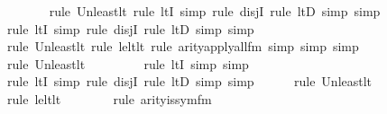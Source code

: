 \begin{isabellebody}
\ \ \ \ \ \ \isamarkupfalse%
{\isacharparenleft}{\kern0pt}rule\ Un{\isacharunderscore}{\kern0pt}least{\isacharunderscore}{\kern0pt}lt{\isacharcomma}{\kern0pt}\ rule\ ltI{\isacharcomma}{\kern0pt}\ simp{\isacharcomma}{\kern0pt}\ rule\ disjI{}{\isacharcomma}{\kern0pt}\ rule\ ltD{\isacharcomma}{\kern0pt}\ simp{\isacharcomma}{\kern0pt}\ simp{\isacharparenright}{\kern0pt}\isanewline
\ \ \ \ \ \ \isamarkupfalse%
{\isacharparenleft}{\kern0pt}rule\ ltI{\isacharcomma}{\kern0pt}\ simp\ {\isacharcomma}{\kern0pt}rule\ disjI{}{\isacharcomma}{\kern0pt}\ rule\ ltD{\isacharcomma}{\kern0pt}\ simp{\isacharcomma}{\kern0pt}\ simp{\isacharparenright}{\kern0pt}\isanewline
\ \ \ \ \ \isamarkupfalse%
{\isacharparenleft}{\kern0pt}rule\ Un{\isacharunderscore}{\kern0pt}least{\isacharunderscore}{\kern0pt}lt{\isacharcomma}{\kern0pt}\ rule\ le{\isacharunderscore}{\kern0pt}lt{\isacharunderscore}{\kern0pt}lt{\isacharcomma}{\kern0pt}\ rule\ arity{\isacharunderscore}{\kern0pt}apply{\isacharunderscore}{\kern0pt}all{\isacharunderscore}{\kern0pt}{}{\isacharunderscore}{\kern0pt}fm{\isacharcomma}{\kern0pt}\ simp{\isacharcomma}{\kern0pt}\ simp{\isacharcomma}{\kern0pt}\ simp{\isacharparenright}{\kern0pt}\isanewline
\ \ \ \ \ \ \isamarkupfalse%
{\isacharparenleft}{\kern0pt}rule\ Un{\isacharunderscore}{\kern0pt}least{\isacharunderscore}{\kern0pt}lt{\isacharparenright}{\kern0pt}{\isacharplus}{\kern0pt}\isanewline
\ \ \ \ \ \ \ \ \isamarkupfalse%
{\isacharparenleft}{\kern0pt}rule\ ltI{\isacharcomma}{\kern0pt}\ simp{\isacharcomma}{\kern0pt}\ simp{\isacharparenright}{\kern0pt}\isanewline
\ \ \ \ \ \ \ \isamarkupfalse%
{\isacharparenleft}{\kern0pt}rule\ ltI{\isacharcomma}{\kern0pt}\ simp{\isacharcomma}{\kern0pt}\ rule\ disjI{}{\isacharcomma}{\kern0pt}\ rule\ ltD{\isacharcomma}{\kern0pt}\ simp{\isacharcomma}{\kern0pt}\ simp{\isacharparenright}{\kern0pt}{\isacharplus}{\kern0pt}\isanewline
\ \ \ \ \ \isamarkupfalse%
{\isacharparenleft}{\kern0pt}rule\ Un{\isacharunderscore}{\kern0pt}least{\isacharunderscore}{\kern0pt}lt{\isacharparenright}{\kern0pt}{\isacharplus}{\kern0pt}\isanewline
\ \ \ \ \ \ \isamarkupfalse%
{\isacharparenleft}{\kern0pt}rule\ le{\isacharunderscore}{\kern0pt}lt{\isacharunderscore}{\kern0pt}lt{\isacharparenright}{\kern0pt}\isanewline
\ \ \ \ \ \ \ \isamarkupfalse%
{\isacharparenleft}{\kern0pt}rule\ arity{\isacharunderscore}{\kern0pt}is{\isacharunderscore}{\kern0pt}sym{\isacharunderscore}{\kern0pt}fm{\isacharparenright}{\kern0pt}\isanewline

\end{isabellebody}
